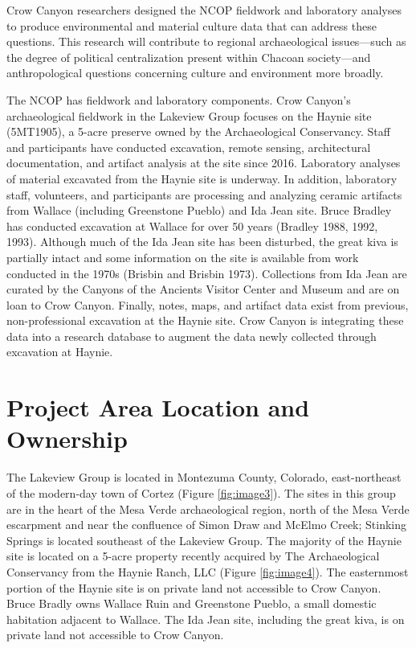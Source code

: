 \documentclass[
  12pt,
]{krantz}
\begin{document}
Crow Canyon researchers designed the NCOP fieldwork and laboratory
analyses to produce environmental and material culture data that can
address these questions. This research will contribute to regional
archaeological issues---such as the degree of political centralization
present within Chacoan society---and anthropological questions
concerning culture and environment more broadly.

The NCOP has fieldwork and laboratory components. Crow Canyon's
archaeological fieldwork in the Lakeview Group focuses on the Haynie
site (5MT1905), a 5-acre preserve owned by the Archaeological
Conservancy. Staff and participants have conducted excavation, remote
sensing, architectural documentation, and artifact analysis at the site
since 2016. Laboratory analyses of material excavated from the Haynie
site is underway. In addition, laboratory staff, volunteers, and
participants are processing and analyzing ceramic artifacts from Wallace
(including Greenstone Pueblo) and Ida Jean site. Bruce Bradley has
conducted excavation at Wallace for over 50 years (Bradley 1988, 1992,
1993). Although much of the Ida Jean site has been disturbed, the great
kiva is partially intact and some information on the site is available
from work conducted in the 1970s (Brisbin and Brisbin 1973). Collections
from Ida Jean are curated by the Canyons of the Ancients Visitor Center
and Museum and are on loan to Crow Canyon. Finally, notes, maps, and
artifact data exist from previous, non-professional excavation at the
Haynie site. Crow Canyon is integrating these data into a research
database to augment the data newly collected through excavation at
Haynie.

\hypertarget{project-area-location-and-ownership}{%
\section{Project Area Location and Ownership}\label{project-area-location-and-ownership}}

The Lakeview Group is located in Montezuma County, Colorado,
east-northeast of the modern-day town of Cortez (Figure \ref{fig:image3}). The sites in
this group are in the heart of the Mesa Verde archaeological region,
north of the Mesa Verde escarpment and near the confluence of Simon Draw
and McElmo Creek; Stinking Springs is located southeast of the Lakeview
Group. The majority of the Haynie site is located on a 5-acre property
recently acquired by The Archaeological Conservancy from the Haynie
Ranch, LLC (Figure \ref{fig:image4}). The easternmost portion of the Haynie site is on
private land not accessible to Crow Canyon. Bruce Bradly owns Wallace
Ruin and Greenstone Pueblo, a small domestic habitation adjacent to
Wallace. The Ida Jean site, including the great kiva, is on private land
not accessible to Crow Canyon.
\end{document}
